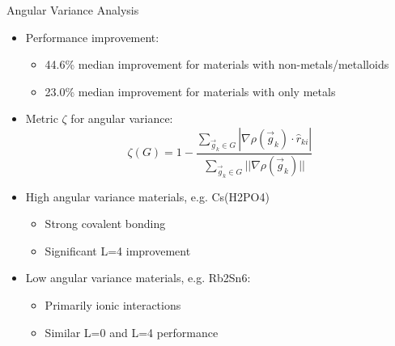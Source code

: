 \begin{frame}{Angular Variance Analysis}
    \begin{itemize}
        \item Performance improvement:
        \begin{itemize}
            \item 44.6\% median improvement for materials with non-metals/metalloids
            \item 23.0\% median improvement for materials with only metals
        \end{itemize}
        \item Metric $\zeta$ for angular variance:
        \[
        \zeta(G) = 1 - \frac{\sum_{\vec{g}_k \in G} |\nabla\rho(\vec{g}_k) \cdot \hat{r}_{ki}|}{\sum_{\vec{g}_k \in G} ||\nabla\rho(\vec{g}_k)||}
        \]
        \item High angular variance materials, e.g. Cs(H2PO4)
        \begin{itemize}
            \item Strong covalent bonding
            \item Significant L=4 improvement
        \end{itemize}
        \item Low angular variance materials, e.g. Rb2Sn6:
        \begin{itemize}
            \item Primarily ionic interactions
            \item Similar L=0 and L=4 performance
        \end{itemize}
    \end{itemize}
\end{frame} 